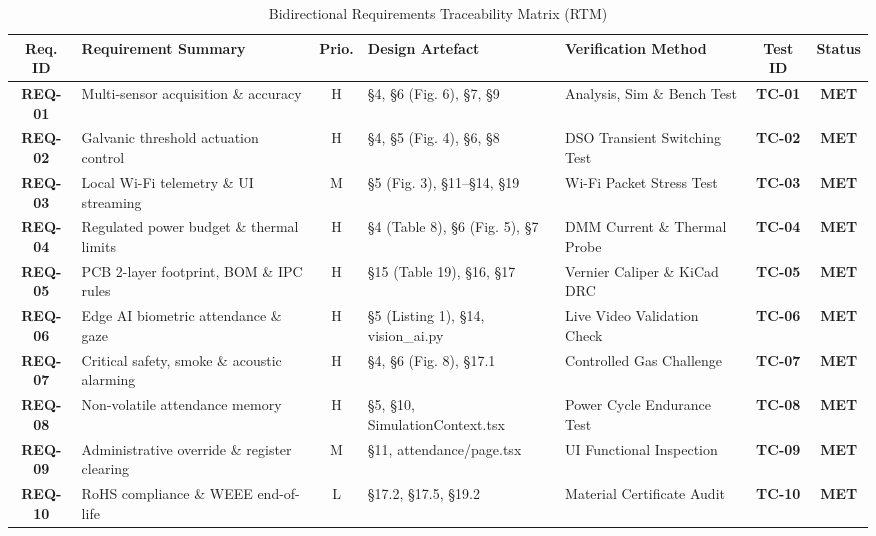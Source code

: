 \documentclass[11pt,a4paper]{article}
\begin{document}
\begin{table}[h!]
\centering
\caption{Bidirectional Requirements Traceability Matrix (RTM)}
\begin{tabular}{|c|p{4.2cm}|c|p{3.8cm}|p{3.2cm}|c|c|}
\hline
\textbf{Req. ID} & \textbf{Requirement Summary} & \textbf{Prio.} & \textbf{Design Artefact} & \textbf{Verification Method} & \textbf{Test ID} & \textbf{Status} \\ \hline
\textbf{REQ-01} & Multi-sensor acquisition \& accuracy & H & \S4, \S6 (Fig. 6), \S7, \S9 & Analysis, Sim \& Bench Test & \textbf{TC-01} & \textbf{MET} \\ \hline
\textbf{REQ-02} & Galvanic threshold actuation control & H & \S4, \S5 (Fig. 4), \S6, \S8 & DSO Transient Switching Test & \textbf{TC-02} & \textbf{MET} \\ \hline
\textbf{REQ-03} & Local Wi-Fi telemetry \& UI streaming & M & \S5 (Fig. 3), \S11–\S14, \S19 & Wi-Fi Packet Stress Test & \textbf{TC-03} & \textbf{MET} \\ \hline
\textbf{REQ-04} & Regulated power budget \& thermal limits & H & \S4 (Table 8), \S6 (Fig. 5), \S7 & DMM Current \& Thermal Probe & \textbf{TC-04} & \textbf{MET} \\ \hline
\textbf{REQ-05} & PCB 2-layer footprint, BOM \& IPC rules & H & \S15 (Table 19), \S16, \S17 & Vernier Caliper \& KiCad DRC & \textbf{TC-05} & \textbf{MET} \\ \hline
\textbf{REQ-06} & Edge AI biometric attendance \& gaze & H & \S5 (Listing 1), \S14, vision\_ai.py & Live Video Validation Check & \textbf{TC-06} & \textbf{MET} \\ \hline
\textbf{REQ-07} & Critical safety, smoke \& acoustic alarming & H & \S4, \S6 (Fig. 8), \S17.1 & Controlled Gas Challenge & \textbf{TC-07} & \textbf{MET} \\ \hline
\textbf{REQ-08} & Non-volatile attendance memory & H & \S5, \S10, SimulationContext.tsx & Power Cycle Endurance Test & \textbf{TC-08} & \textbf{MET} \\ \hline
\textbf{REQ-09} & Administrative override \& register clearing & M & \S11, attendance/page.tsx & UI Functional Inspection & \textbf{TC-09} & \textbf{MET} \\ \hline
\textbf{REQ-10} & RoHS compliance \& WEEE end-of-life & L & \S17.2, \S17.5, \S19.2 & Material Certificate Audit & \textbf{TC-10} & \textbf{MET} \\ \hline
\end{tabular}
\end{table}
\end{document}
